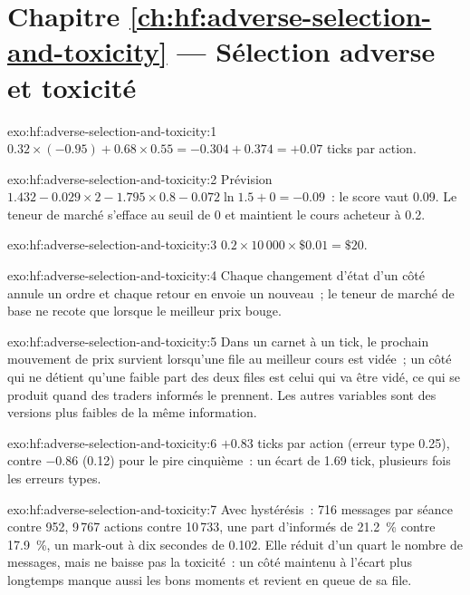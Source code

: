 \section*{Chapitre \ref{ch:hf:adverse-selection-and-toxicity} --- Sélection adverse et toxicité}

\begin{solution}{exo:hf:adverse-selection-and-toxicity:1}
$0.32\times(-0.95)+0.68\times0.55=-0.304+0.374=+0.07$ ticks par action.
\end{solution}

\begin{solution}{exo:hf:adverse-selection-and-toxicity:2}
Prévision $1.432-0.029\times2-1.795\times0.8-0.072\ln1.5+0=-0.09$~: le score vaut 0.09. Le teneur de marché s'efface au seuil de 0 et maintient le cours acheteur à 0.2.
\end{solution}

\begin{solution}{exo:hf:adverse-selection-and-toxicity:3}
$0.2\times10\,000\times\$0.01=\$20$.
\end{solution}

\begin{solution}{exo:hf:adverse-selection-and-toxicity:4}
Chaque changement d'état d'un côté annule un ordre et chaque retour en envoie un nouveau~; le teneur de marché de base ne recote que lorsque le meilleur prix bouge.
\end{solution}

\begin{solution}{exo:hf:adverse-selection-and-toxicity:5}
Dans un carnet à un tick, le prochain mouvement de prix survient lorsqu'une file au meilleur cours est vidée~; un côté qui ne détient qu'une faible part des deux files est celui qui va être
vidé, ce qui se produit quand des traders informés le prennent. Les autres variables sont des versions plus faibles de la même information.
\end{solution}

\begin{solution}{exo:hf:adverse-selection-and-toxicity:6}
$+0.83$ ticks par action (erreur type 0.25), contre $-0.86$ (0.12) pour le pire cinquième~: un écart de 1.69 tick, plusieurs fois les erreurs types.
\end{solution}

\begin{solution}{exo:hf:adverse-selection-and-toxicity:7}
Avec hystérésis~: 716 messages par séance contre 952, 9\,767 actions contre 10\,733, une part d'informés de 21.2~\% contre 17.9~\%, un mark-out à dix secondes
de 0.102. Elle réduit d'un quart le nombre de messages, mais ne baisse pas la toxicité~: un côté maintenu à l'écart plus longtemps manque aussi les bons moments et revient
en queue de sa file.
\end{solution}


